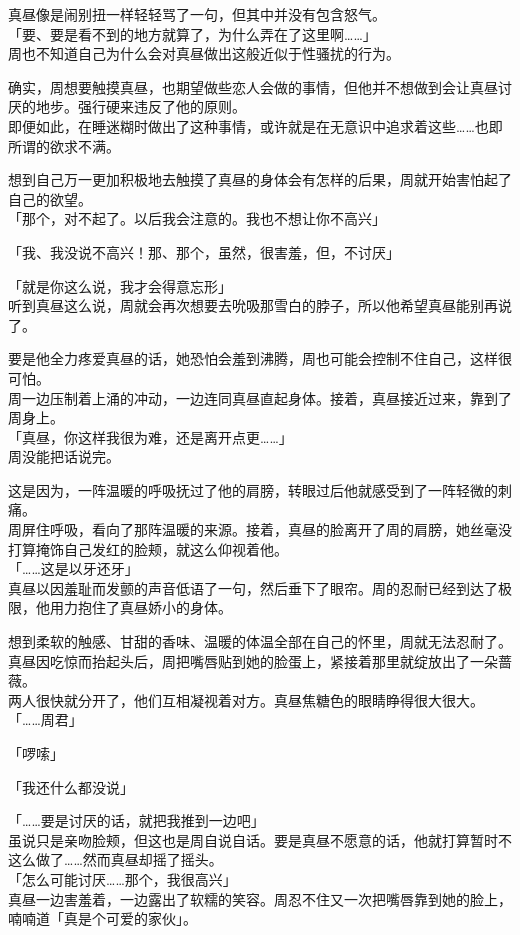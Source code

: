 真昼像是闹别扭一样轻轻骂了一句，但其中并没有包含怒气。\\

「要、要是看不到的地方就算了，为什么弄在了这里啊……」\\

周也不知道自己为什么会对真昼做出这般近似于性骚扰的行为。

确实，周想要触摸真昼，也期望做些恋人会做的事情，但他并不想做到会让真昼讨厌的地步。强行硬来违反了他的原则。\\

即便如此，在睡迷糊时做出了这种事情，或许就是在无意识中追求着这些……也即所谓的欲求不满。

想到自己万一更加积极地去触摸了真昼的身体会有怎样的后果，周就开始害怕起了自己的欲望。\\

「那个，对不起了。以后我会注意的。我也不想让你不高兴」

「我、我没说不高兴！那、那个，虽然，很害羞，但，不讨厌」

「就是你这么说，我才会得意忘形」\\

听到真昼这么说，周就会再次想要去吮吸那雪白的脖子，所以他希望真昼能别再说了。

要是他全力疼爱真昼的话，她恐怕会羞到沸腾，周也可能会控制不住自己，这样很可怕。\\

周一边压制着上涌的冲动，一边连同真昼直起身体。接着，真昼接近过来，靠到了周身上。\\

「真昼，你这样我很为难，还是离开点更……」\\

周没能把话说完。

这是因为，一阵温暖的呼吸抚过了他的肩膀，转眼过后他就感受到了一阵轻微的刺痛。\\

周屏住呼吸，看向了那阵温暖的来源。接着，真昼的脸离开了周的肩膀，她丝毫没打算掩饰自己发红的脸颊，就这么仰视着他。\\

「……这是以牙还牙」\\

真昼以因羞耻而发颤的声音低语了一句，然后垂下了眼帘。周的忍耐已经到达了极限，他用力抱住了真昼娇小的身体。

想到柔软的触感、甘甜的香味、温暖的体温全部在自己的怀里，周就无法忍耐了。\\

真昼因吃惊而抬起头后，周把嘴唇贴到她的脸蛋上，紧接着那里就绽放出了一朵蔷薇。\\

两人很快就分开了，他们互相凝视着对方。真昼焦糖色的眼睛睁得很大很大。\\

「……周君」

「啰嗦」

「我还什么都没说」

「……要是讨厌的话，就把我推到一边吧」\\

虽说只是亲吻脸颊，但这也是周自说自话。要是真昼不愿意的话，他就打算暂时不这么做了……然而真昼却摇了摇头。\\

「怎么可能讨厌……那个，我很高兴」\\

真昼一边害羞着，一边露出了软糯的笑容。周忍不住又一次把嘴唇靠到她的脸上，喃喃道「真是个可爱的家伙」。

